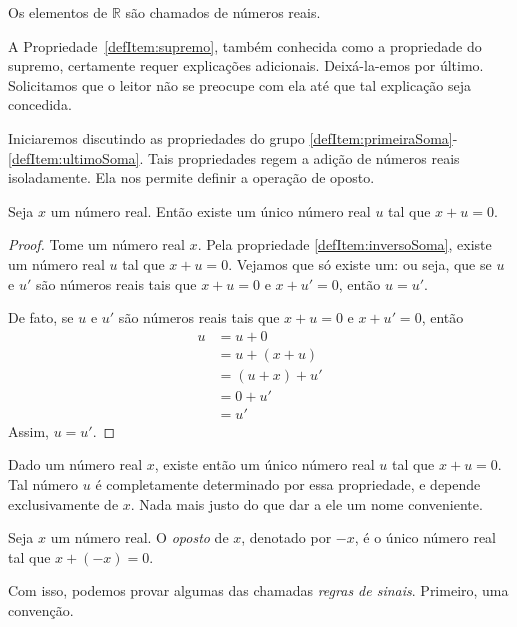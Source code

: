 \begin{definition}
    Os elementos de $\mathbb R$ são chamados de números reais.
\end{definition}

A Propriedade~\ref{defItem:supremo}, também conhecida como a propriedade do supremo, certamente requer explicações adicionais.
Deixá-la-emos por último.
Solicitamos que o leitor não se preocupe com ela até que tal explicação seja concedida.

Iniciaremos discutindo as propriedades do grupo \ref{defItem:primeiraSoma}-\ref{defItem:ultimoSoma}.
Tais propriedades regem a adição de números reais isoladamente.
Ela nos permite definir a operação de oposto.

\begin{proposition}
    Seja $x$ um número real.
    Então existe um único número real $u$ tal que $x+u=0$.
\end{proposition}
\begin{proof}
    Tome um número real $x$.
    Pela propriedade \ref{defItem:inversoSoma}, existe um número real $u$ tal que $x+u=0$.
    Vejamos que só existe um: ou seja, que se $u$ e $u'$ são números reais tais que $x+u=0$ e $x+u'=0$, então $u=u'$.

    De fato, se $u$ e $u'$ são números reais tais que $x+u=0$ e $x+u'=0$, então
\begin{align*}
    u &= u + 0 \tag{0 é neutro da soma} \\
    &= u + (x + u) \tag{pela escolha de $u$} \\
    &= (u + x) + u' \tag{propriedade associativa} \\
    &= 0 + u' \tag{pela escolha de $u'$} \\
    &= u' \tag{0 é neutro da soma}
\end{align*}
Assim, $u=u'$.
\end{proof}

Dado um número real $x$, existe então um único número real $u$ tal que $x+u=0$.
Tal número $u$ é completamente determinado por essa propriedade, e depende exclusivamente de $x$.
Nada mais justo do que dar a ele um nome conveniente.

\begin{definition}
    Seja $x$ um número real.
    O \emph{oposto} de $x$, denotado por $-x$, é o único número real tal que $x+(-x)=0$.
\end{definition}

Com isso, podemos provar algumas das chamadas \emph{regras de sinais}.
Primeiro, uma convenção.

